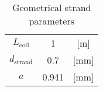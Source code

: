 \begin{table}[h!]
    \caption{Geometrical strand parameters} 
    \vspace{-1.em} 
    \fontsize{10}{10}
    \selectfont 
    \renewcommand{\arraystretch}{1.5}
    \begin{center}
        \begin{tabular}{ ccc }  
        \hline
        $L_\text{coil}$ & 1 & [m] \\
        $d_\text{strand}$ & 0.7 & [mm] \\
        $a$ & 0.941 & [mm] \\
        \hline 
        \end{tabular}
    \end{center}  
     \label{table: 1d_quench_propagation_geometry_parameters} 
 \end{table}

